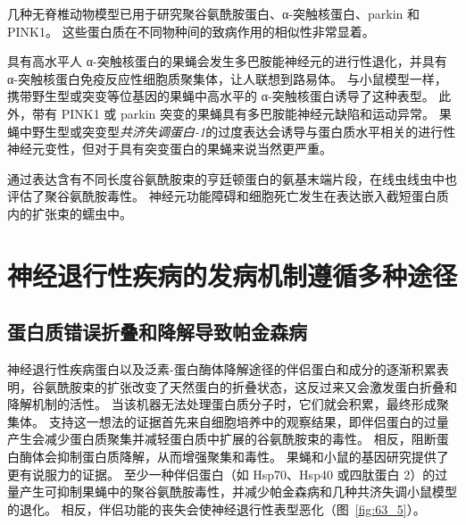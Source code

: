 几种无脊椎动物模型已用于研究聚谷氨酰胺蛋白、α-突触核蛋白、parkin 和 PINK1。
这些蛋白质在不同物种间的致病作用的相似性非常显着。


具有高水平人 α-突触核蛋白的果蝇会发生多巴胺能神经元的进行性退化，并具有 α-突触核蛋白免疫反应性细胞质聚集体，让人联想到路易体。
与小鼠模型一样，携带野生型或突变等位基因的果蝇中高水平的 α-突触核蛋白诱导了这种表型。
此外，带有 PINK1 或 parkin 突变的果蝇具有多巴胺能神经元缺陷和运动异常。
果蝇中野生型或突变型\textit{共济失调蛋白-1}的过度表达会诱导与蛋白质水平相关的进行性神经元变性，但对于具有突变蛋白的果蝇来说当然更严重。


通过表达含有不同长度谷氨酰胺束的亨廷顿蛋白的氨基末端片段，在线虫线虫中也评估了聚谷氨酰胺毒性。
神经元功能障碍和细胞死亡发生在表达嵌入截短蛋白质内的扩张束的蠕虫中。



\section{神经退行性疾病的发病机制遵循多种途径}

\subsection{蛋白质错误折叠和降解导致帕金森病}

神经退行性疾病蛋白以及泛素-蛋白酶体降解途径的伴侣蛋白和成分的逐渐积累表明，谷氨酰胺束的扩张改变了天然蛋白的折叠状态，这反过来又会激发蛋白折叠和降解机制的活性。
当该机器无法处理蛋白质分子时，它们就会积累，最终形成聚集体。
支持这一想法的证据首先来自细胞培养中的观察结果，即伴侣蛋白的过量产生会减少蛋白质聚集并减轻蛋白质中扩展的谷氨酰胺束的毒性。
相反，阻断蛋白酶体会抑制蛋白质降解，从而增强聚集和毒性。
果蝇和小鼠的基因研究提供了更有说服力的证据。
至少一种伴侣蛋白（如 Hsp70、Hsp40 或四肽蛋白 2）的过量产生可抑制果蝇中的聚谷氨酰胺毒性，并减少帕金森病和几种共济失调小鼠模型的退化。
相反，伴侣功能的丧失会使神经退行性表型恶化（图~\ref{fig:63_5}）。


